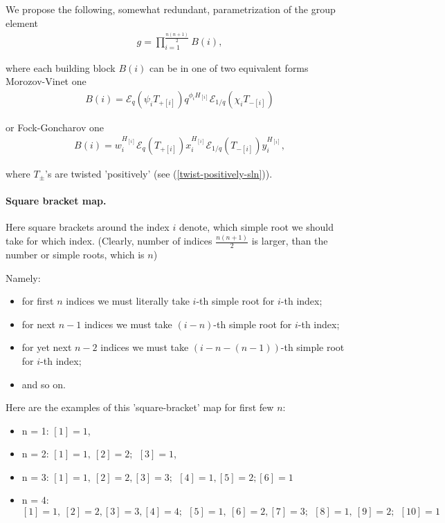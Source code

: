 \documentclass{article}
\newcommand{\lb}{\left (}
\newcommand{\rb}{\right )}
\newcommand{\B}[1]{\lb #1 \rb}
\newcommand{\lsb}{\left [}
\newcommand{\rsb}{\right ]}
\newcommand{\SB}[1]{\lsb #1 \rsb}
\newcommand{\be}{\begin{eqnarray}}
\newcommand{\ee}{\end{eqnarray}}
\newcommand {\?}{\textit{???}}
\newcommand{\me}[0]{\mathcal{E}}
\newcommand{\Tp}[1][]{T_{+ #1}}
\newcommand{\Tm}[1][]{T_{- #1}}
\newcommand{\delabel}[1]{(\ref{#1})}
\begin{document}
We propose the following, somewhat redundant, parametrization of the group element
\be
\label{quantum-group-element-sln}
g = \prod_{i = 1}^{\frac{n(n+1)}{2}}B(i),
\ee

where each building block $B(i)$ can be in one of two equivalent forms \\
Morozov-Vinet one
\be
\label{building-block-mv-sln}
B(i) = \me_q \B{\psi_i \Tp[\SB{i}]} q^{\phi_i H_{[i]}} \me_{1/q} \B{\chi_i \Tm[\SB{i}]}
\ee

or Fock-Goncharov one
\be
\label{building-block-sln-fg}
B(i) = w_i^{H_{[i]}} \me_q \B{\Tp[\SB{i}]} x_i^{H_{[i]}} \me_{1/q} \B{\Tm[\SB{i}]} y_i^{H_{[i]}},
\ee

where $T_\pm$'s are twisted 'positively' (see \delabel{twist-positively-sln}).

\paragraph{Square bracket map.} Here square brackets around the index $i$ denote, which simple root
we should take for which index. (Clearly, number of indices $\frac{n(n + 1)}{2}$ is larger, than the number
or simple roots, which is $n$)

Namely:
\begin{itemize}
  \item for first $n$ indices we must literally take $i$-th simple root for $i$-th index;
\item for next $n - 1$ indices we must take $(i - n)$-th simple root for $i$-th index;
  \item for yet next $n - 2$ indices we must take $(i - n - (n - 1))$-th simple root for $i$-th index;
\item and so on.
\end{itemize}

Here are the examples of this 'square-bracket' map for first few $n$:
\begin{itemize}
\item n = 1: $\SB{1} = 1$,
\item n = 2: $\SB{1} = 1,\ \SB{2} = 2;\ \
  \SB{3} = 1$,
\item n = 3: $\SB{1} = 1,\ \SB{2} = 2, \SB{3} = 3;\ \ 
  \SB{4} = 1, \SB{5} = 2;
  \SB{6} = 1$
\item n = 4: $\SB{1} = 1,\ \SB{2} = 2, \SB{3} = 3, \SB{4} = 4;\ \
  \SB{5} = 1,\ \SB{6} = 2, \SB{7} = 3;\ \
  \SB{8} = 1,\ \SB{9} = 2;\ \
  \SB{10} = 1$
\end{itemize}
\end{document}
